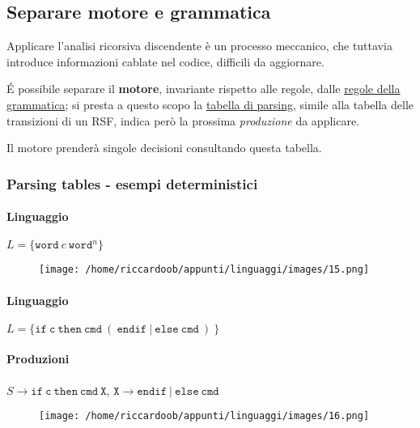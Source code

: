 \subsection{Separare motore e grammatica}
Applicare l'analisi ricorsiva discendente è un processo meccanico, che tuttavia introduce informazioni cablate nel codice, difficili da aggiornare.

É possibile separare il \textbf{motore}, invariante rispetto alle regole, dalle \underline{regole della grammatica}; si presta a questo scopo la \underline{tabella di parsing}, simile alla tabella delle transizioni di un RSF, indica però la prossima \textit{produzione} da applicare.

Il motore prenderà singole decisioni consultando questa tabella.

\subsubsection{Parsing tables - esempi deterministici}

\paragraph{Linguaggio} $L = \{\texttt{word}\ c\ \texttt{word}^n\}$

\begin{figure}[H]
    \centering
    \texttt{[image: /home/riccardoob/appunti/linguaggi/images/15.png]}
\end{figure}

\paragraph{Linguaggio} $L = \{\texttt{if}\ \texttt{c}\ \texttt{then}\ \texttt{cmd}\ (\ \texttt{endif}\ |\ \texttt{else}\ \texttt{cmd}\ )\ \}$ 

\paragraph{Produzioni} $S \rightarrow \texttt{if}\ \texttt{c}\ \texttt{then} \ \texttt{cmd} \ \texttt{X} $, $\texttt{X}  \rightarrow \texttt{endif}\ |\ \texttt{else}\ \texttt{cmd} $ 

\begin{figure}[H]
    \centering
    \texttt{[image: /home/riccardoob/appunti/linguaggi/images/16.png]}
\end{figure}

